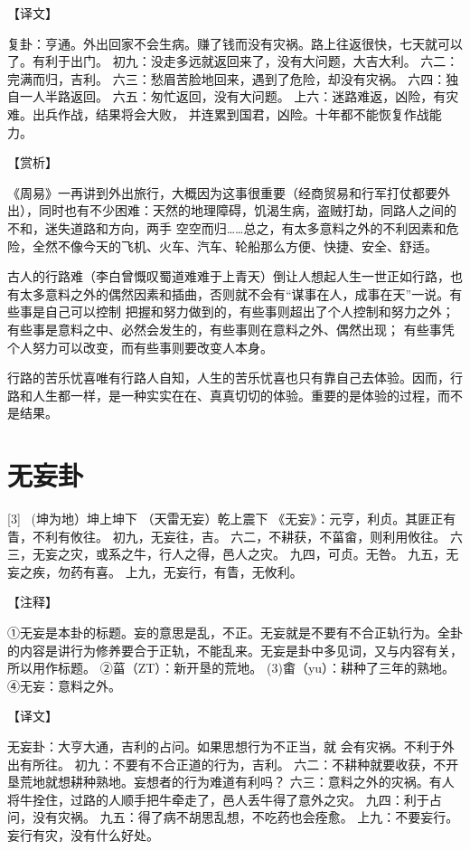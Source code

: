 \documentclass[12pt,UTF8]{ctexbook}
\begin{document}
【译文】

复卦：亨通。外出回家不会生病。赚了钱而没有灾祸。路上往返很快，七天就可以了。有利于出门。
初九：没走多远就返回来了，没有大问题，大吉大利。
六二：完满而归，吉利。
六三：愁眉苦脸地回来，遇到了危险，却没有灾祸。
六四：独自一人半路返回。
六五：匆忙返回，没有大问题。
上六：迷路难返，凶险，有灾难。出兵作战，结果将会大败， 并连累到国君，凶险。十年都不能恢复作战能力。

【赏析】

《周易》一再讲到外出旅行，大概因为这事很重要（经商贸易和行军打仗都要外出），同时也有不少困难：天然的地理障碍，饥渴生病，盗贼打劫，同路人之间的不和，迷失道路和方向，两手 空空而归……总之，有太多意料之外的不利因素和危险，全然不像今天的飞机、火车、汽车、轮船那么方便、快捷、安全、舒适。

古人的行路难（李白曾慨叹蜀道难难于上青天）倒让人想起人生一世正如行路，也有太多意料之外的偶然因素和插曲，否则就不会有“谋事在人，成事在天”一说。有些事是自己可以控制 把握和努力做到的，有些事则超出了个人控制和努力之外；有些事是意料之中、必然会发生的，有些事则在意料之外、偶然出现； 有些事凭个人努力可以改变，而有些事则要改变人本身。

行路的苦乐忧喜唯有行路人自知，人生的苦乐忧喜也只有靠自己去体验。因而，行路和人生都一样，是一种实实在在、真真切切的体验。重要的是体验的过程，而不是结果。

\chapter{无妄卦}
[3] \ (坤为地）坤上坤下
（天雷无妄）乾上震下
《无妄》：元亨，利贞。其匪正有眚，不利有攸往。
初九，无妄往，吉。
六二，不耕获，不菑畲，则利用攸往。
六三，无妄之灾，或系之牛，行人之得，邑人之灾。
九四，可贞。无咎。
九五，无妄之疾，勿药有喜。
上九，无妄行，有眚，无攸利。

【注释】

①无妄是本卦的标题。妄的意思是乱，不正。无妄就是不要有不合正轨行为。全卦的内容是讲行为修养要合于正轨，不能乱来。无妄是卦中多见词，又与内容有关，所以用作标题。
②菑（ZT）：新开垦的荒地。
(3)畬（yu）：耕种了三年的熟地。
④无妄：意料之外。

【译文】

无妄卦：大亨大通，吉利的占问。如果思想行为不正当，就 会有灾祸。不利于外出有所往。
初九：不要有不合正道的行为，吉利。
六二：不耕种就要收获，不开垦荒地就想耕种熟地。妄想者的行为难道有利吗？
六三：意料之外的灾祸。有人将牛拴住，过路的人顺手把牛牵走了，邑人丢牛得了意外之灾。
九四：利于占问，没有灾祸。
九五：得了病不胡思乱想，不吃药也会痊愈。
上九：不要妄行。妄行有灾，没有什么好处。
\end{document}
